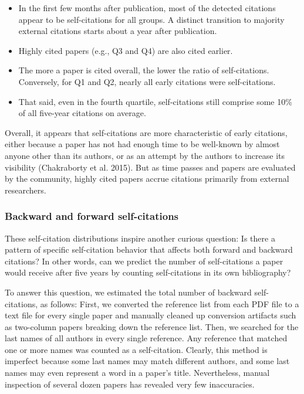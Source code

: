 \documentclass{article}
\providecommand{\tightlist}{%
  \setlength{\itemsep}{0pt}\setlength{\parskip}{0pt}}
\begin{document}
\begin{itemize}
\tightlist
\item
  In the first few months after publication, most of the detected citations appear to be self-citations for all groups. A distinct transition to majority external citations starts about a year after publication.
\item
  Highly cited papers (e.g., Q3 and Q4) are also cited earlier.
\item
  The more a paper is cited overall, the lower the ratio of self-citations. Conversely, for Q1 and Q2, nearly all early citations were self-citations.
\item
  That said, even in the fourth quartile, self-citations still comprise some 10\% of all five-year citations on average.
\end{itemize}

Overall, it appears that self-citations are more characteristic of early citations, either because a paper has not had enough time to be well-known by almost anyone other than its authors, or as an attempt by the authors to increase its visibility (Chakraborty et al. 2015).
But as time passes and papers are evaluated by the community, highly cited papers accrue citations primarily from external researchers.

\hypertarget{backward-and-forward-self-citations}{%
\subsubsection{Backward and forward self-citations}\label{backward-and-forward-self-citations}}

These self-citation distributions inspire another curious question: Is there a pattern of specific self-citation behavior that affects both forward and backward citations?
In other words, can we predict the number of self-citations a paper would receive after five years by counting self-citations in its own bibliography?

To answer this question, we estimated the total number of backward self-citations, as follows:
First, we converted the reference list from each PDF file to a text file for every single paper and manually cleaned up conversion artifacts such as two-column papers breaking down the reference list.
Then, we searched for the last names of all authors in every single reference.
Any reference that matched one or more names was counted as a self-citation.
Clearly, this method is imperfect because some last names may match different authors, and some last names may even represent a word in a paper's title.
Nevertheless, manual inspection of several dozen papers has revealed very few inaccuracies.
\end{document}
